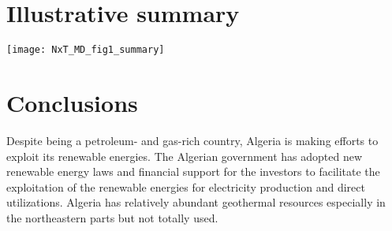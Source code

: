 \documentclass[a0,portrait]{a0poster}
\newcommand*{\barbar}[1]{\overline{\overline{#1}}}
\begin{document}
\begin{multicols}{3}


\color{SaddleBrown} %


\section*{Illustrative summary}
\begin{center}\vspace{1cm}
\texttt{[image: NxT\_MD\_fig1\_summary]}
\end{center}\vspace{1cm}

\section*{Conclusions}
Despite being a petroleum- and gas-rich country, Algeria is making efforts to exploit its renewable energies. The Algerian government has adopted new renewable energy laws and financial support for the investors to facilitate the exploitation of the renewable energies for electricity production and direct utilizations. Algeria has relatively abundant geothermal resources especially in the northeastern parts but not totally used.
\color{Black} %


\end{multicols}
\end{document}
